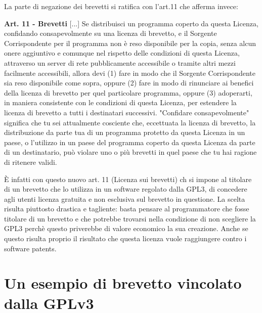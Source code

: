 La parte di negazione dei brevetti si ratifica con l'art.11 che afferma invece:\\

\begin{scriptsize}

\textbf{Art. 11 -  Brevetti}
[...]
Se distribuisci un programma coperto da questa Licenza, confidando consapevolmente su una licenza di brevetto, e il Sorgente Corrispondente per il programma non è reso disponibile per la copia, senza alcun onere aggiuntivo e comunque nel rispetto delle condizioni di questa Licenza, attraverso un server di rete pubblicamente accessibile o tramite altri mezzi facilmente accessibili, allora devi (1) fare in modo che il Sorgente Corrispondente sia reso disponibile come sopra, oppure (2) fare in modo di rinunciare ai benefici della licenza di brevetto per quel particolare programma, oppure (3) adoperarti, in maniera consistente con le condizioni di questa Licenza, per estendere la licenza di brevetto a tutti i destinatari successivi. "Confidare consapevolmente" significa che tu sei attualmente cosciente che, eccettuata la licenza di brevetto, la distribuzione da parte tua di un programma protetto da questa Licenza in un paese, o l'utilizzo in un paese del programma coperto da questa Licenza da parte di un destinatario, può violare uno o più brevetti in quel paese che tu hai ragione di ritenere validi.\\

\end{scriptsize}


\`E infatti con questo nuovo art. 11 (Licenza sui brevetti) ch si impone al titolare di un brevetto che lo utilizza in un software regolato dalla GPL3, di concedere agli utenti licenza gratuita e non esclusiva sul brevetto in questione. La scelta risulta piuttosto drastica e tagliente: basta pensare al programmatore che fosse titolare di un brevetto e che potrebbe trovarsi nella condizione di non scegliere la GPL3 perchè questo priverebbe di valore economico la sua creazione. Anche se questo risulta proprio il risultato che questa licenza vuole raggiungere contro i software patents.




\section{Un esempio di brevetto vincolato dalla GPLv3}

